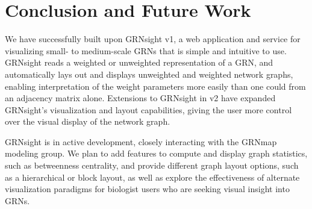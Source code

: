 \documentclass[sigconf,review]{acmart}
\begin{document}
\section{Conclusion and Future Work}
We have successfully built upon GRNsight v1, a web application and service for visualizing small- to medium-scale GRNs that is simple and intuitive to use. GRNsight reads a weighted or unweighted representation of a GRN, and automatically lays out and displays unweighted and weighted network graphs, enabling interpretation of the weight parameters more easily than one could from an adjacency matrix alone. Extensions to GRNsight in v2 have expanded GRNsight's visualization and layout capabilities, giving the user more control over the visual display of the network graph.

GRNsight is in active development, closely interacting with the GRNmap modeling group. We plan to add features to compute and display graph statistics, such as betweenness centrality, and provide different graph layout options, such as a hierarchical or block layout, as well as explore the effectiveness of alternate visualization paradigms for biologist users who are seeking visual insight into GRNs.



\end{document}
